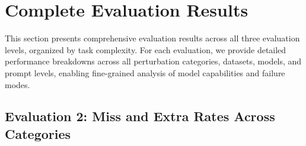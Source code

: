 \documentclass[11pt]{article}
\begin{document}








\section{Complete Evaluation Results}
\label{sec:appendix-evaluation}

This section presents comprehensive evaluation results across all three evaluation levels, organized by task complexity. For each evaluation, we provide detailed performance breakdowns across all perturbation categories, datasets, models, and prompt levels, enabling fine-grained analysis of model capabilities and failure modes.

\subsection{Evaluation 2: Miss and Extra Rates Across Categories}
\label{sec:appendix-eval2-miss-extra}
\end{document}
